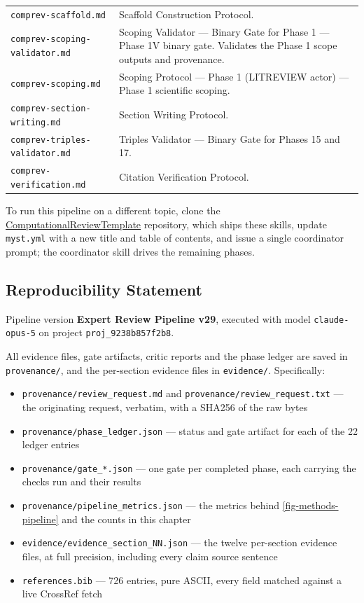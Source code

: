 \documentclass[11pt]{article}
\begin{document}
\begin{table}[H]
\begin{tabular}{ll}
\texttt{comprev-scaffold.md} & Scaffold Construction Protocol. \\
\texttt{comprev-scoping-validator.md} & Scoping Validator --- Binary Gate for Phase 1 --- Phase 1V binary gate. Validates the Phase 1 scope outputs and provenance. \\
\texttt{comprev-scoping.md} & Scoping Protocol --- Phase 1 (LITREVIEW actor) --- Phase 1 scientific scoping. \\
\texttt{comprev-section-writing.md} & Section Writing Protocol. \\
\texttt{comprev-triples-validator.md} & Triples Validator --- Binary Gate for Phases 15 and 17. \\
\texttt{comprev-verification.md} & Citation Verification Protocol. \\
\bottomrule
\end{tabular}
\end{table}

To run this pipeline on a different topic, clone the \href{https://github.com/AllenNeuralDynamics/ComputationalReviewTemplate}{ComputationalReviewTemplate} repository, which ships these skills, update \texttt{myst.yml} with a new title and table of contents, and issue a single coordinator prompt; the coordinator skill drives the remaining phases.

\subsection{Reproducibility Statement}
\label{sec-methods-reproducibility}

Pipeline version \textbf{Expert Review Pipeline v29}, executed with model \texttt{claude-opus-5} on project \texttt{proj\_9238b857f2b8}.

All evidence files, gate artifacts, critic reports and the phase ledger are saved in \texttt{provenance/}, and the per-section evidence files in \texttt{evidence/}. Specifically:

\begin{itemize}
\item \texttt{provenance/review\_request.md} and \texttt{provenance/review\_request.txt} --- the originating request, verbatim, with a SHA256 of the raw bytes
\item \texttt{provenance/phase\_ledger.json} --- status and gate artifact for each of the 22 ledger entries
\item \texttt{provenance/gate\_*.json} --- one gate per completed phase, each carrying the checks run and their results
\item \texttt{provenance/pipeline\_metrics.json} --- the metrics behind \ref{fig-methods-pipeline} and the counts in this chapter
\item \texttt{evidence/evidence\_section\_NN.json} --- the twelve per-section evidence files, at full precision, including every claim source sentence
\item \texttt{references.bib} --- 726 entries, pure ASCII, every field matched against a live CrossRef fetch
\end{itemize}
\end{document}
